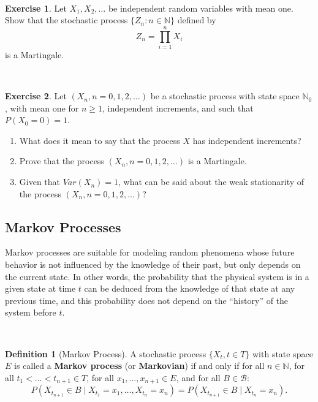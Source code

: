 \documentclass[
  11pt,
  a4paper,
]{book}
\theoremstyle{definition}
\newtheorem{definition}{Definition}[chapter]
\theoremstyle{definition}
\theoremstyle{definition}
\newtheorem{exercise}{Exercise}[chapter]
\theoremstyle{definition}
\theoremstyle{remark}
\begin{document}
\(\,\)

\begin{exercise}
\leavevmode

Let \(X_1, X_2, \dots\) be independent random variables with mean one. Show that the stochastic process \(\{Z_n: n \in \mathbb{N}\}\) defined by
\[
Z_n = \prod_{i=1}^n X_i
\]
is a Martingale.

\end{exercise}

\(\,\)

\begin{exercise}

Let \((X_n, n=0,1,2,\dots)\) be a stochastic process with state space \(\mathbb{N}_0\), with mean one for \(n \geq 1\), independent increments, and such that \(P(X_0=0) = 1\).

\begin{enumerate}
\def\labelenumi{(\alph{enumi})}
\item
  What does it mean to say that the process \(X\) has independent increments?
\item
  Prove that the process \((X_n, n=0,1,2,\dots)\) is a Martingale.
\item
  Given that \(Var(X_n) = 1\), what can be said about the weak stationarity of the process \((X_n, n=0,1,2,\dots)\)?
\end{enumerate}

\end{exercise}

\subsection{Markov Processes}\label{markov-processes}

Markov processes are suitable for modeling random phenomena whose future behavior is not influenced by the knowledge of their past, but only depends on the current state. In other words, the probability that the physical system is in a given state at time \(t\) can be deduced from the knowledge of that state at any previous time, and this probability does not depend on the ``history'' of the system before \(t\).

\(\,\)

\begin{definition}[Markov Process]
A stochastic process \(\{X_t, t \in T\}\) with state space \(E\) is called a \textbf{Markov process} (or \textbf{Markovian}) if and only if for all \(n \in \mathbb{N}\), for all \(t_1 < \ldots < t_{n+1} \in T\), for all \(x_1, \ldots, x_{n+1} \in E\), and for all \(B \in \mathcal{B}\):
\[
P(X_{t_{n+1}} \in B \mid X_{t_1} = x_1, \ldots, X_{t_n} = x_n) = P(X_{t_{n+1}} \in B \mid X_{t_n} = x_n).
\]
\end{definition}
\end{document}
